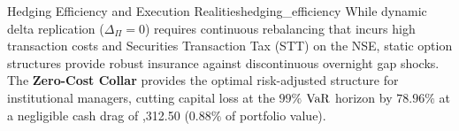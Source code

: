 \begin{empiricalbox}{Hedging Efficiency and Execution Realities}{hedging_efficiency}
While dynamic delta replication ($\Delta_{\Pi} = 0$) requires continuous rebalancing that incurs high transaction costs and Securities Transaction Tax (STT) on the NSE, static option structures provide robust insurance against discontinuous overnight gap shocks. The \textbf{Zero-Cost Collar} provides the optimal risk-adjusted structure for institutional managers, cutting capital loss at the $99\%$ $\operatorname{VaR}$ horizon by \textbf{$78.96\%$} at a negligible cash drag of ,312.50 ($0.88\%$ of portfolio value).
\end{empiricalbox}
